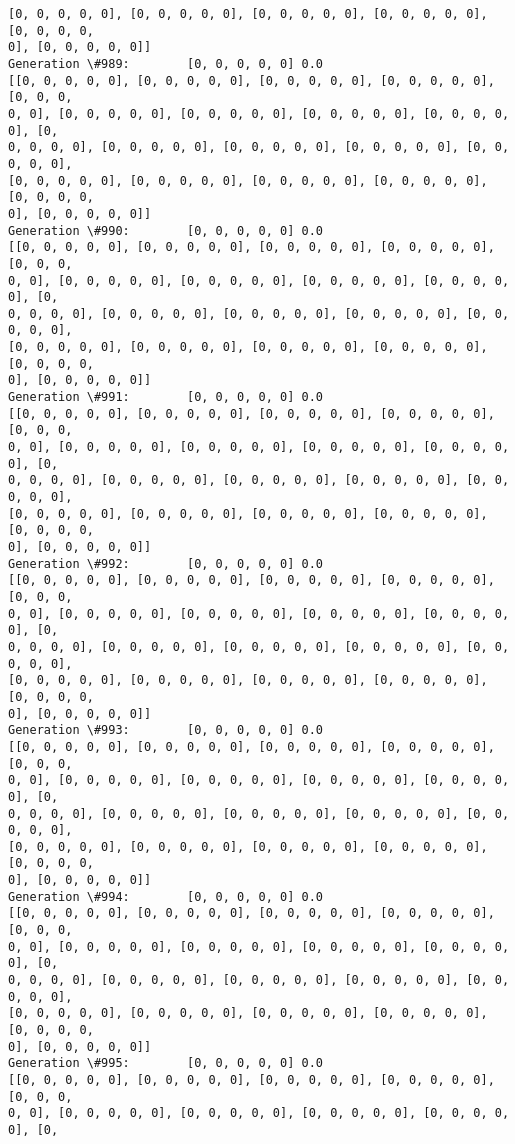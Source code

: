 \documentclass[11pt]{article}
\begin{document}
\begin{Verbatim}[commandchars=\\\{\}]
[0, 0, 0, 0, 0], [0, 0, 0, 0, 0], [0, 0, 0, 0, 0], [0, 0, 0, 0, 0], [0, 0, 0, 0,
0], [0, 0, 0, 0, 0]]
Generation \#989:        [0, 0, 0, 0, 0] 0.0
[[0, 0, 0, 0, 0], [0, 0, 0, 0, 0], [0, 0, 0, 0, 0], [0, 0, 0, 0, 0], [0, 0, 0,
0, 0], [0, 0, 0, 0, 0], [0, 0, 0, 0, 0], [0, 0, 0, 0, 0], [0, 0, 0, 0, 0], [0,
0, 0, 0, 0], [0, 0, 0, 0, 0], [0, 0, 0, 0, 0], [0, 0, 0, 0, 0], [0, 0, 0, 0, 0],
[0, 0, 0, 0, 0], [0, 0, 0, 0, 0], [0, 0, 0, 0, 0], [0, 0, 0, 0, 0], [0, 0, 0, 0,
0], [0, 0, 0, 0, 0]]
Generation \#990:        [0, 0, 0, 0, 0] 0.0
[[0, 0, 0, 0, 0], [0, 0, 0, 0, 0], [0, 0, 0, 0, 0], [0, 0, 0, 0, 0], [0, 0, 0,
0, 0], [0, 0, 0, 0, 0], [0, 0, 0, 0, 0], [0, 0, 0, 0, 0], [0, 0, 0, 0, 0], [0,
0, 0, 0, 0], [0, 0, 0, 0, 0], [0, 0, 0, 0, 0], [0, 0, 0, 0, 0], [0, 0, 0, 0, 0],
[0, 0, 0, 0, 0], [0, 0, 0, 0, 0], [0, 0, 0, 0, 0], [0, 0, 0, 0, 0], [0, 0, 0, 0,
0], [0, 0, 0, 0, 0]]
Generation \#991:        [0, 0, 0, 0, 0] 0.0
[[0, 0, 0, 0, 0], [0, 0, 0, 0, 0], [0, 0, 0, 0, 0], [0, 0, 0, 0, 0], [0, 0, 0,
0, 0], [0, 0, 0, 0, 0], [0, 0, 0, 0, 0], [0, 0, 0, 0, 0], [0, 0, 0, 0, 0], [0,
0, 0, 0, 0], [0, 0, 0, 0, 0], [0, 0, 0, 0, 0], [0, 0, 0, 0, 0], [0, 0, 0, 0, 0],
[0, 0, 0, 0, 0], [0, 0, 0, 0, 0], [0, 0, 0, 0, 0], [0, 0, 0, 0, 0], [0, 0, 0, 0,
0], [0, 0, 0, 0, 0]]
Generation \#992:        [0, 0, 0, 0, 0] 0.0
[[0, 0, 0, 0, 0], [0, 0, 0, 0, 0], [0, 0, 0, 0, 0], [0, 0, 0, 0, 0], [0, 0, 0,
0, 0], [0, 0, 0, 0, 0], [0, 0, 0, 0, 0], [0, 0, 0, 0, 0], [0, 0, 0, 0, 0], [0,
0, 0, 0, 0], [0, 0, 0, 0, 0], [0, 0, 0, 0, 0], [0, 0, 0, 0, 0], [0, 0, 0, 0, 0],
[0, 0, 0, 0, 0], [0, 0, 0, 0, 0], [0, 0, 0, 0, 0], [0, 0, 0, 0, 0], [0, 0, 0, 0,
0], [0, 0, 0, 0, 0]]
Generation \#993:        [0, 0, 0, 0, 0] 0.0
[[0, 0, 0, 0, 0], [0, 0, 0, 0, 0], [0, 0, 0, 0, 0], [0, 0, 0, 0, 0], [0, 0, 0,
0, 0], [0, 0, 0, 0, 0], [0, 0, 0, 0, 0], [0, 0, 0, 0, 0], [0, 0, 0, 0, 0], [0,
0, 0, 0, 0], [0, 0, 0, 0, 0], [0, 0, 0, 0, 0], [0, 0, 0, 0, 0], [0, 0, 0, 0, 0],
[0, 0, 0, 0, 0], [0, 0, 0, 0, 0], [0, 0, 0, 0, 0], [0, 0, 0, 0, 0], [0, 0, 0, 0,
0], [0, 0, 0, 0, 0]]
Generation \#994:        [0, 0, 0, 0, 0] 0.0
[[0, 0, 0, 0, 0], [0, 0, 0, 0, 0], [0, 0, 0, 0, 0], [0, 0, 0, 0, 0], [0, 0, 0,
0, 0], [0, 0, 0, 0, 0], [0, 0, 0, 0, 0], [0, 0, 0, 0, 0], [0, 0, 0, 0, 0], [0,
0, 0, 0, 0], [0, 0, 0, 0, 0], [0, 0, 0, 0, 0], [0, 0, 0, 0, 0], [0, 0, 0, 0, 0],
[0, 0, 0, 0, 0], [0, 0, 0, 0, 0], [0, 0, 0, 0, 0], [0, 0, 0, 0, 0], [0, 0, 0, 0,
0], [0, 0, 0, 0, 0]]
Generation \#995:        [0, 0, 0, 0, 0] 0.0
[[0, 0, 0, 0, 0], [0, 0, 0, 0, 0], [0, 0, 0, 0, 0], [0, 0, 0, 0, 0], [0, 0, 0,
0, 0], [0, 0, 0, 0, 0], [0, 0, 0, 0, 0], [0, 0, 0, 0, 0], [0, 0, 0, 0, 0], [0,

\end{Verbatim}
\end{document}
